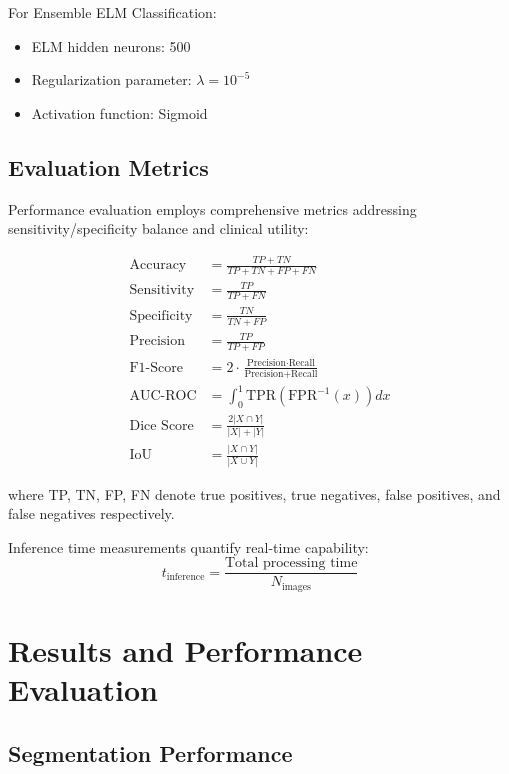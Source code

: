 \documentclass[11pt,a4paper]{article}
\begin{document}
For Ensemble ELM Classification:
\begin{itemize}
\item ELM hidden neurons: 500
\item Regularization parameter: $\lambda = 10^{-5}$
\item Activation function: Sigmoid
\end{itemize}

\subsection{Evaluation Metrics}

Performance evaluation employs comprehensive metrics addressing sensitivity/specificity balance and clinical utility:

\begin{align}
\text{Accuracy} &= \frac{TP + TN}{TP + TN + FP + FN} \\
\text{Sensitivity} &= \frac{TP}{TP + FN} \\
\text{Specificity} &= \frac{TN}{TN + FP} \\
\text{Precision} &= \frac{TP}{TP + FP} \\
\text{F1-Score} &= 2 \cdot \frac{\text{Precision} \cdot \text{Recall}}{\text{Precision} + \text{Recall}} \\
\text{AUC-ROC} &= \int_0^1 \text{TPR}(\text{FPR}^{-1}(x)) dx \\
\text{Dice Score} &= \frac{2|X \cap Y|}{|X| + |Y|} \\
\text{IoU} &= \frac{|X \cap Y|}{|X \cup Y|}
\end{align}

where TP, TN, FP, FN denote true positives, true negatives, false positives, and false negatives respectively.

Inference time measurements quantify real-time capability:
\begin{equation}
t_{\text{inference}} = \frac{\text{Total processing time}}{N_{\text{images}}}
\end{equation}

\section{Results and Performance Evaluation}
\label{sec:results}

\subsection{Segmentation Performance}
\end{document}
